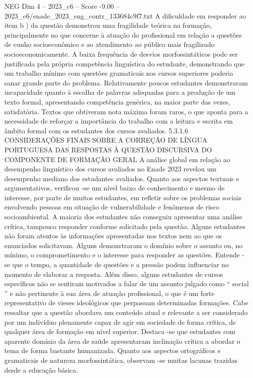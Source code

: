\begin{textsample}{NEG Dim 4 – 2023\_c6 – Score -9.00 – 2023\_c6/enade\_2023\_eng\_contr\_133684c9f7.txt}
A dificuldade em responder ao item b ) da questão demonstrou uma fragilidade teórica na formação, principalmente no que concerne à atuação do profissional em relação a questões de cunho socioeconômico e ao atendimento ao público mais fragilizado socioeconomicamente.
A baixa frequência de desvios morfossintáticos pode ser justificada pela própria competência linguística do estudante, demonstrando que um trabalho mínimo com questões gramaticais nos cursos superiores poderia sanar grande parte do problema.
Relativamente poucos estudantes demonstraram incapacidade quanto à escolha de palavras adequadas para a produção de um texto formal, apresentando competência genérica, na maior parte das vezes, satisfatória.
Textos que obtiveram nota máxima foram raros, o que aponta para a necessidade de reforçar a importância do trabalho com a leitura e escrita em âmbito formal com os estudantes dos cursos avaliados. 5.3.1.6 CONSIDERAÇÕES FINAIS SOBRE A CORREÇÃO DE LÍNGUA PORTUGUESA DAS RESPOSTAS À QUESTÃO DISCURSIVA DO COMPONENTE DE FORMAÇÃO GERAL A análise global em relação ao desempenho linguístico dos cursos avaliados no Enade 2023 revelou um desempenho mediano dos estudantes avaliados.
Quanto aos aspectos textuais e argumentativos, verificou -se um nível baixo de conhecimento e mesmo de interesse, por parte de muitos estudantes, em refletir sobre os problemas sociais envolvendo pessoas em situação de vulnerabilidade e fenômenos de risco socioambiental.
A maioria dos estudantes não conseguiu apresentar uma análise crítica, tampouco responder conforme solicitado pela questão.
Alguns estudantes não foram atentos às informações apresentadas nos textos nem ao que os enunciados solicitavam.
Alguns demonstraram o domínio sobre o assunto ou, no mínimo, o comprometimento e o interesse para responder as questões.
Entende -se que o tempo, a quantidade de questões e a pressão podem influenciar no momento de elaborar a resposta.
Além disso, alguns estudantes de cursos específicos não se sentiram motivados a falar de um assunto julgado como “ social ” e não pertinente à sua área de atuação profissional, o que é um forte representativo de vieses ideológicos que perpassam determinadas formações.
Cabe ressaltar que a questão abordava um conteúdo atual e relevante a ser considerado por um indivíduo plenamente capaz de agir em sociedade de forma crítica, de qualquer área de formação em nível superior.
Destaca -se que estudantes com aparente domínio da área de saúde apresentaram inclinação crítica a abordar o tema de forma bastante humanizada.
Quanto aos aspectos ortográficos e gramaticais de natureza morfossintática, observam -se muitas lacunas trazidas desde a educação básica.

\end{textsample}
